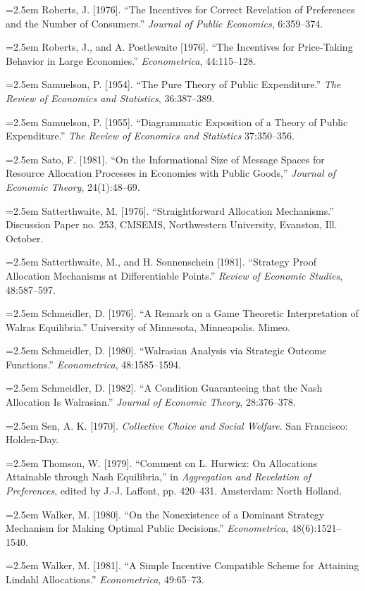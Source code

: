 \documentclass[12pt, letterpaper]{article}
\newcommand{\bibentry}[1]{\noindent\hangindent=2.5em\hangafter=1 \small #1 \par\vspace{0.75em}}
\begin{document}
\bibentry{Roberts, J. [1976]. ``The Incentives for Correct Revelation of Preferences and the Number of Consumers.'' \textit{Journal of Public Economics}, 6:359--374.}

\bibentry{Roberts, J., and A. Postlewaite [1976]. ``The Incentives for Price-Taking Behavior in Large Economies.'' \textit{Econometrica}, 44:115--128.}

\bibentry{Samuelson, P. [1954]. ``The Pure Theory of Public Expenditure.'' \textit{The Review of Economics and Statistics}, 36:387--389.}

\bibentry{Samuelson, P. [1955]. ``Diagrammatic Exposition of a Theory of Public Expenditure.'' \textit{The Review of Economics and Statistics} 37:350--356.}

\bibentry{Sato, F. [1981]. ``On the Informational Size of Message Spaces for Resource Allocation Processes in Economies with Public Goods,'' \textit{Journal of Economic Theory}, 24(1):48--69.}

\bibentry{Satterthwaite, M. [1976]. ``Straightforward Allocation Mechanisms.'' Discussion Paper no. 253, CMSEMS, Northwestern University, Evanston, Ill. October.}

\bibentry{Satterthwaite, M., and H. Sonnenschein [1981]. ``Strategy Proof Allocation Mechanisms at Differentiable Points.'' \textit{Review of Economic Studies}, 48:587--597.}

\bibentry{Schmeidler, D. [1976]. ``A Remark on a Game Theoretic Interpretation of Walras Equilibria.'' University of Minnesota, Minneapolis. Mimeo.}

\bibentry{Schmeidler, D. [1980]. ``Walrasian Analysis via Strategic Outcome Functions.'' \textit{Econometrica}, 48:1585--1594.}

\bibentry{Schmeidler, D. [1982]. ``A Condition Guaranteeing that the Nash Allocation Is Walrasian.'' \textit{Journal of Economic Theory}, 28:376--378.}


\bibentry{Sen, A. K. [1970]. \textit{Collective Choice and Social Welfare}. San Francisco: Holden-Day.}

\bibentry{Thomson, W. [1979]. ``Comment on L. Hurwicz: On Allocations Attainable through Nash Equilibria,'' in \textit{Aggregation and Revelation of Preferences}, edited by J.-J. Laffont, pp. 420--431. Amsterdam: North Holland.}

\bibentry{Walker, M. [1980]. ``On the Nonexistence of a Dominant Strategy Mechanism for Making Optimal Public Decisions.'' \textit{Econometrica}, 48(6):1521--1540.}

\bibentry{Walker, M. [1981]. ``A Simple Incentive Compatible Scheme for Attaining Lindahl Allocations.'' \textit{Econometrica}, 49:65--73.}
\end{document}
